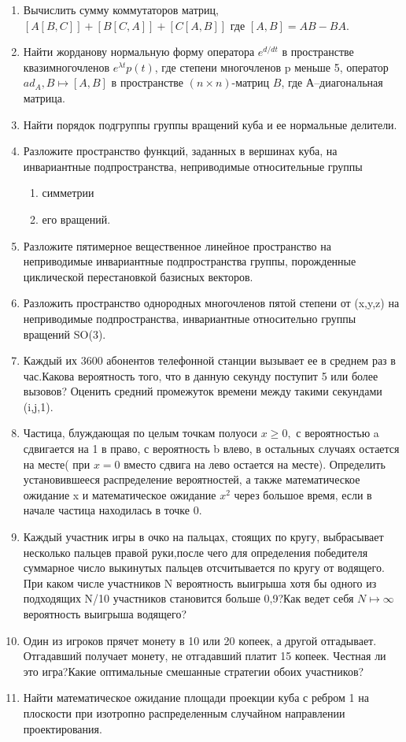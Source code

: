 \documentclass{article}
\begin{document}
\begin{enumerate}
\item Вычислить сумму коммутаторов матриц, $[A[B,C]]+[B[C,A]]+[C[A,B]]$ где $[A,B]=AB-BA.$
\item Найти жорданову нормальную форму оператора $e^{d/dt}$ в пространстве квазимногочленов ${e^{\lambda t}p(t)}$, где степени многочленов p меньше 5, оператор $ad_{A}, B\mapsto[A,B]$ в пространстве $(n\times n)$-матриц $B$, где $А$--диагональная матрица.
\item Найти порядок подгруппы группы вращений куба и ее нормальные делители.
\item Разложите пространство функций, заданных в вершинах куба, на инвариантные подпространства, неприводимые относительные группы 

\begin{enumerate}
\item симметрии 
\item его вращений.
\end{enumerate}
\item Разложите пятимерное вещественное линейное пространство на неприводимые инвариантные подпространства группы, порожденные циклической перестановкой базисных векторов.
\item Разложить пространство однородных многочленов пятой степени от (x,y,z) на неприводимые подпространства, инвариантные относительно группы вращений SO(3).
\item Каждый их 3600 абонентов телефонной станции вызывает ее в среднем раз в час.Какова вероятность того, что в данную секунду поступит 5 или более вызовов? Оценить средний промежуток времени между такими секундами (i,j,1).
\item Частица, блуждающая по целым точкам полуоси $x\geq0,$ с вероятностью a сдвигается на 1 в право, с вероятность b влево, в остальных случаях остается на месте( при $x=0$ вместо сдвига на лево остается на месте). Определить установившееся распределение вероятностей, а также математическое ожидание x и математическое ожидание $x^{2}$ через большое время, если в начале частица находилась в точке 0.
\item Каждый участник игры в очко на пальцах, стоящих по кругу, выбрасывает несколько пальцев правой руки,после чего для определения победителя суммарное число выкинутых пальцев отсчитывается по кругу от водящего. При каком числе участников N вероятность выигрыша хотя бы одного из подходящих N/10 участников становится больше 0,9?Как ведет себя $N\mapsto\infty$ вероятность выигрыша водящего?
\item Один из игроков прячет монету в 10 или 20 копеек, а другой отгадывает. Отгадавший получает монету, не отгадавший платит 15 копеек. Честная ли это игра?Какие оптимальные смешанные стратегии обоих участников?
\item Найти математическое ожидание площади проекции куба с ребром 1 на плоскости при изотропно распределенным случайном направлении проектирования.
\end{enumerate}
\end{document}
